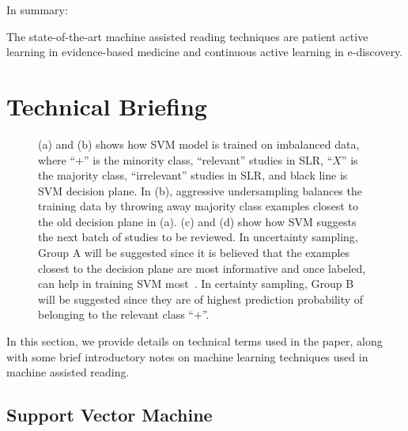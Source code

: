 \documentclass[final,twocolumn,5p]{elsarticle}
\theoremstyle{break}
\begin{document}
In summary: 
\begin{lesson}
    The state-of-the-art machine assisted reading techniques are patient active learning in evidence-based medicine and continuous active learning in e-discovery.
\end{lesson}








\section{Technical Briefing}
\label{sect: Technical Briefing}

\begin{figure}[!b]
    \centering
    \quad
    
    \caption{(a) and (b) shows how SVM model is trained on imbalanced data, where ``$+$'' is the minority class, ``relevant'' studies in SLR, ``$X$'' is the majority class, ``irrelevant'' studies in SLR, and black line is SVM decision plane. In (b), aggressive undersampling balances the training data by throwing away majority class examples closest to the old decision plane in (a). (c) and (d) show how SVM suggests the next batch of studies to be reviewed. In uncertainty sampling, Group A will be suggested since it is believed that the examples closest to the decision plane are most informative and once labeled, can help in training SVM most~\cite{settles2012active}. In certainty sampling, Group B will be suggested since they are of highest prediction probability of belonging to the relevant class ``$+$''.}
    \label{fig:SVM}
\end{figure}

In this section, we provide details on technical terms 
used in the paper,  along with some brief introductory
notes on machine learning techniques used in machine assisted reading.

\subsection{Support Vector Machine}
\label{sect: Support Vector Machine}
\end{document}
